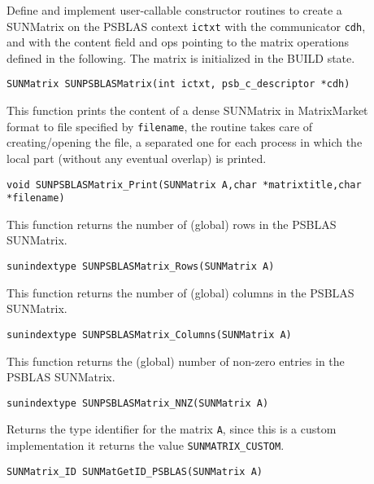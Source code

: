 \documentclass[twoside,a4paper]{refart}
\begin{document}
\begin{description}
\item[] Define and implement user-callable constructor routines to create a
SUNMatrix on the PSBLAS context \lstinline[style=CStyle]|ictxt| with the communicator \lstinline[style=CStyle]|cdh|, and with the content field and ops pointing to the matrix operations defined in the following. The matrix is initialized in the BUILD state.

 \lstinline[style=CStyle]|SUNMatrix SUNPSBLASMatrix(int ictxt, psb_c_descriptor *cdh)|

\item[] This function prints the content of a dense SUNMatrix in MatrixMarket format to file specified by \texttt{filename}, the routine takes care of creating/opening the file, a separated one for each process in which the local part (without any eventual overlap) is printed.
 
 \lstinline[style=CStyle]|void SUNPSBLASMatrix_Print(SUNMatrix A,char *matrixtitle,char *filename)|

\item[] This function returns the number of (global) rows in the PSBLAS SUNMatrix.

 \lstinline[style=CStyle]|sunindextype SUNPSBLASMatrix_Rows(SUNMatrix A)|

\item[] This function returns the number of (global) columns in the PSBLAS SUNMatrix.

 \lstinline[style=CStyle]|sunindextype SUNPSBLASMatrix_Columns(SUNMatrix A)|

\item[] This function returns the (global) number of non-zero entries in the PSBLAS SUNMatrix.

 \lstinline[style=CStyle]|sunindextype SUNPSBLASMatrix_NNZ(SUNMatrix A)|

\item[] Returns the type identifier for the matrix \texttt{A}, since this is a custom implementation it returns the value \texttt{SUNMATRIX\_CUSTOM}.

 \lstinline[style=CStyle]|SUNMatrix_ID SUNMatGetID_PSBLAS(SUNMatrix A)| 


\end{description}
\end{document}
